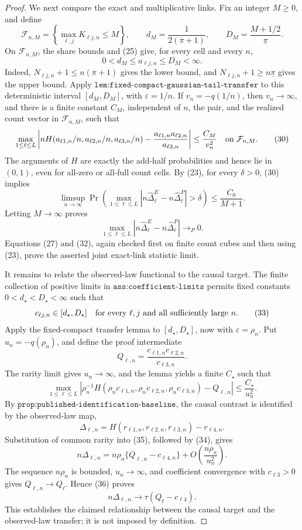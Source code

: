 \documentclass{article}
\begin{document}
\begin{proof}
We next compare the exact and multiplicative links.  Fix an integer \(M\geq0\), and define
\[
\mathcal F_{n,M}=\left\{\max_{\ell,j}K_{\ell j,n}\leq M\right\},
\qquad
d_M=\frac1{2(\overline\pi+1)},
\qquad
D_M=\frac{M+1/2}{\underline\pi}.
\tag{28}
\]
On \(\mathcal F_{n,M}\), the share bounds and (25) give, for every cell and every \(n\),
\[
0<d_M\leq a_{\ell j,n}\leq D_M<\infty.
\tag{29}
\]
Indeed, \(N_{\ell j,n}+1\leq n(\overline\pi+1)\) gives the lower bound, and \(N_{\ell j,n}+1\geq n\underline\pi\) gives the upper bound.  Apply \(\texttt{lem:fixed-compact-gaussian-tail-transfer}\) to this deterministic interval \([d_M,D_M]\), with \(\varepsilon=1/n\).  If \(v_n=-q(1/n)\), then \(v_n\to\infty\), and there is a finite constant \(C_M\), independent of \(n\), the pair, and the realized count vector in \(\mathcal F_{n,M}\), such that
\[
\max_{1\leq\ell\leq L}
\left|
nH(a_{\ell1,n}/n,a_{\ell2,n}/n,a_{\ell3,n}/n)
-\frac{a_{\ell1,n}a_{\ell2,n}}{a_{\ell3,n}}
\right|
\leq\frac{C_M}{v_n^2}
\quad\hbox{on }\mathcal F_{n,M}.
\tag{30}
\]
The arguments of \(H\) are exactly the add-half probabilities and hence lie in \((0,1)\), even for all-zero or all-full count cells.  By (23), for every \(\delta>0\), (30) implies
\[
\limsup_{n\to\infty}
\Pr\!\left(
\max_{1\leq\ell\leq L}
|n\widehat\Delta^E_{\ell}-n\widehat\Delta^P_{\ell}|>\delta
\right)
\leq\frac{C_0}{M+1}.
\tag{31}
\]
Letting \(M\to\infty\) proves
\[
\max_{1\leq\ell\leq L}
|n\widehat\Delta^E_{\ell}-n\widehat\Delta^P_{\ell}|
\longrightarrow_P0.
\tag{32}
\]
Equations (27) and (32), again checked first on finite count cubes and then using (23), prove the asserted joint exact-link statistic limit.

It remains to relate the observed-law functional to the causal target.  The finite collection of positive limits in \(\texttt{ass:coefficient-limits}\) permits fixed constants \(0<d_\star<D_\star<\infty\) such that
\[
c_{\ell j,n}\in[d_\star,D_\star]
\quad\hbox{for every }\ell,j\hbox{ and all sufficiently large }n.
\tag{33}
\]
Apply the fixed-compact transfer lemma to \([d_\star,D_\star]\), now with \(\varepsilon=\rho_n\).  Put \(u_n=-q(\rho_n)\), and define the proof intermediate
\[
Q_{\ell,n}=\frac{c_{\ell1,n}c_{\ell2,n}}{c_{\ell3,n}}.
\]
The rarity limit gives \(u_n\to\infty\), and the lemma yields a finite \(C_\star\) such that
\[
\max_{1\leq\ell\leq L}
\left|
\rho_n^{-1}H(\rho_nc_{\ell1,n},\rho_nc_{\ell2,n},\rho_nc_{\ell3,n})
-Q_{\ell,n}
\right|
\leq\frac{C_\star}{u_n^2}.
\tag{34}
\]
By \(\texttt{prop:published-identification-baseline}\), the causal contrast is identified by the observed-law map,
\[
\Delta_{\ell,n}
=H(r_{\ell1,n},r_{\ell2,n},r_{\ell3,n})-r_{\ell4,n}.
\tag{35}
\]
Substitution of common rarity into (35), followed by (34), gives
\[
n\Delta_{\ell,n}
=n\rho_n\{Q_{\ell,n}-c_{\ell4,n}\}
+O\!\left(\frac{n\rho_n}{u_n^2}\right).
\tag{36}
\]
The sequence \(n\rho_n\) is bounded, \(u_n\to\infty\), and coefficient convergence with \(c_{\ell3}>0\) gives \(Q_{\ell,n}\to Q_{\ell}\).  Hence (36) proves
\[
n\Delta_{\ell,n}\longrightarrow
\tau(Q_{\ell}-c_{\ell4}).
\tag{37}
\]
This establishes the claimed relationship between the causal target and the observed-law transfer; it is not imposed by definition.


\end{proof}
\end{document}

